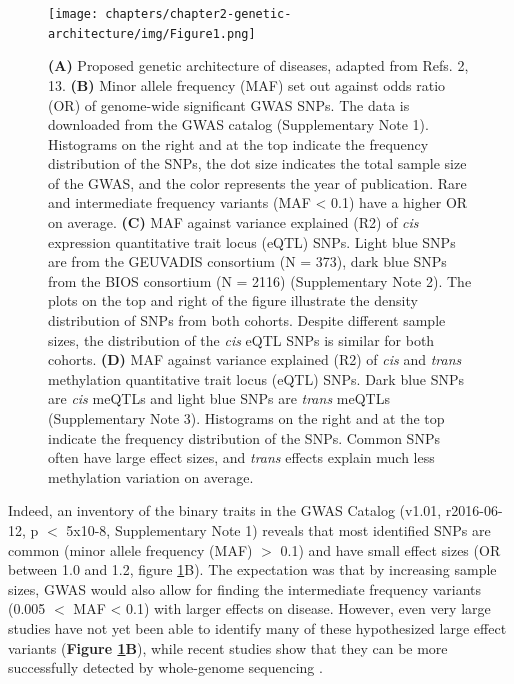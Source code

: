 \begin{figure}[H]
	\texttt{[image: chapters/chapter2-genetic-architecture/img/Figure1.png]}
	\caption{\footnotesize \textbf{(A)} Proposed genetic architecture of diseases, adapted from Refs. 2, 13. \textbf{(B)} Minor allele frequency (MAF) set out against odds ratio (OR) of genome-wide significant GWAS SNPs. The data is downloaded from the GWAS catalog (Supplementary Note 1). Histograms on the right and at the top indicate the frequency distribution of the SNPs, the dot size indicates the total sample size of the GWAS, and the color represents the year of publication. Rare and intermediate frequency variants (MAF < 0.1) have a higher OR on average. \textbf{(C)} MAF against variance explained (R2) of \emph{cis} expression quantitative trait locus (eQTL) SNPs. Light blue SNPs are from the GEUVADIS consortium (N = 373), dark blue SNPs from the BIOS consortium (N = 2116) (Supplementary Note 2). The plots on the top and right of the figure illustrate the density distribution of SNPs from both cohorts. Despite different sample sizes, the distribution of the \emph{cis} eQTL SNPs is similar for both cohorts. \textbf{(D)} MAF against variance explained (R2) of \emph{cis} and \emph{trans} methylation quantitative trait locus (eQTL) SNPs. Dark blue SNPs are \emph{cis} meQTLs and light blue SNPs are \emph{trans} meQTLs (Supplementary Note 3). Histograms on the right and at the top indicate the frequency distribution of the SNPs. Common SNPs often have large effect sizes, and \emph{trans} effects explain much less methylation variation on average.}
	\label{architecture_fig1}
\end{figure}

Indeed, an inventory of the binary traits in the GWAS Catalog (v1.01, r2016-06-12, p $<$ 5x10-8, Supplementary Note 1) reveals that most identified SNPs are common (minor allele frequency (MAF) $>$ 0.1) and have small effect sizes (OR between 1.0 and 1.2, figure \ref{architecture_fig1}B). The expectation was that by increasing sample sizes, GWAS would also allow for finding the intermediate frequency variants (0.005 $<$ MAF < 0.1) with larger effects on disease. However, even very large studies have not yet been able to identify many of these hypothesized large effect variants \cite{fuchsbergerGeneticArchitectureType2016} (\textbf{Figure \ref{architecture_fig1}B}), while recent studies show that they can be more successfully detected by whole-genome sequencing \cite{del-aguilaAlzheimerDiseaseRare2015,walterUK10KProjectIdentifies2015}.

